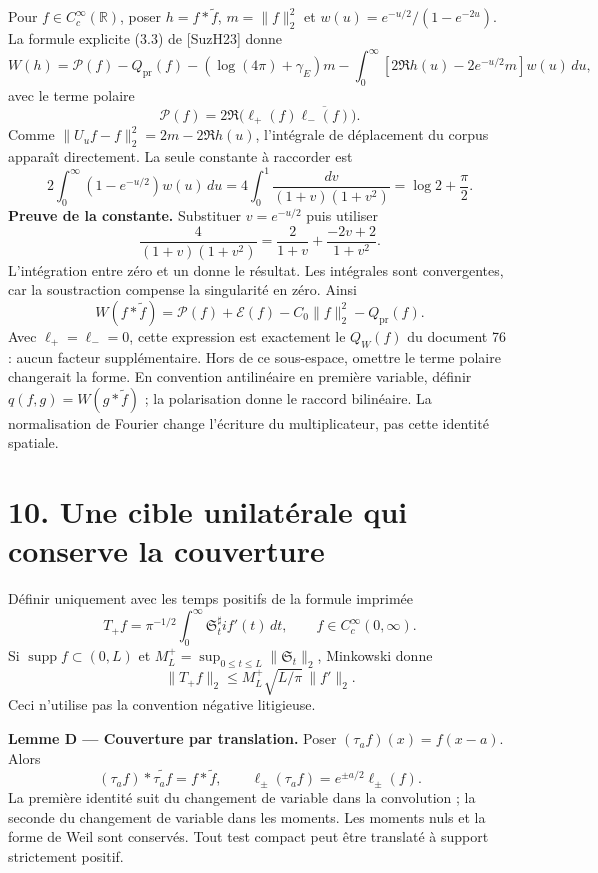 \documentclass[
  11pt,
]{article}
\begin{document}
Pour \(f\in C_c^\infty(\mathbb R)\), poser \(h=f*\widetilde f\),
\(m=\|f\|_2^2\) et \(w(u)=e^{-u/2}/(1-e^{-2u})\). La formule explicite
(3.3) de {[}SuzH23{]} donne \[
W(h)=\mathcal P(f)-Q_{\mathrm{pr}}(f)
 -(\log(4\pi)+\gamma_E)m
 -\int_0^\infty[2\Re h(u)-2e^{-u/2}m]w(u)\,du,
\] avec le terme polaire \[
\mathcal P(f)=2\Re\bigl(\ell_+(f)\overline{\ell_-(f)}\bigr).
\] Comme \(\|U_uf-f\|_2^2=2m-2\Re h(u)\), l'intégrale de déplacement du
corpus apparaît directement. La seule constante à raccorder est \[
2\int_0^\infty(1-e^{-u/2})w(u)\,du
=4\int_0^1\frac{dv}{(1+v)(1+v^2)}
=\log 2+\frac\pi2.
\] \textbf{Preuve de la constante.} Substituer \(v=e^{-u/2}\) puis
utiliser \[
\frac4{(1+v)(1+v^2)}
=\frac2{1+v}+\frac{-2v+2}{1+v^2}.
\] L'intégration entre zéro et un donne le résultat. Les intégrales sont
convergentes, car la soustraction compense la singularité en zéro. Ainsi
\[
\boxed{W(f*\widetilde f)=\mathcal P(f)
 +\mathcal E(f)-C_0\|f\|_2^2-Q_{\mathrm{pr}}(f).}
\] Avec \(\ell_+=\ell_-=0\), cette expression est exactement le
\(Q_W(f)\) du document 76 : aucun facteur supplémentaire. Hors de ce
sous-espace, omettre le terme polaire changerait la forme. En convention
antilinéaire en première variable, définir \(q(f,g)=W(g*\widetilde f)\)
; la polarisation donne le raccord bilinéaire. La normalisation de
Fourier change l'écriture du multiplicateur, pas cette identité
spatiale.

\hypertarget{une-cible-unilatuxe9rale-qui-conserve-la-couverture}{%
\section{10. Une cible unilatérale qui conserve la
couverture}\label{une-cible-unilatuxe9rale-qui-conserve-la-couverture}}

Définir uniquement avec les temps positifs de la formule imprimée \[
T_+f=\pi^{-1/2}\int_0^\infty\mathfrak S_t^\sharp if'(t)\,dt,
\qquad f\in C_c^\infty(0,\infty).
\] Si \(\operatorname{supp}f\subset(0,L)\) et
\(M_L^+=\sup_{0\le t\le L}\|\mathfrak S_t\|_2\), Minkowski donne \[
\|T_+f\|_2\le M_L^+\sqrt{L/\pi}\,\|f'\|_2.
\] Ceci n'utilise pas la convention négative litigieuse.

\textbf{Lemme D --- Couverture par translation.} Poser
\((\tau_af)(x)=f(x-a)\). Alors \[
(\tau_af)*\widetilde{\tau_af}=f*\widetilde f,
\qquad\ell_\pm(\tau_af)=e^{\pm a/2}\ell_\pm(f).
\] La première identité suit du changement de variable dans la
convolution ; la seconde du changement de variable dans les moments. Les
moments nuls et la forme de Weil sont conservés. Tout test compact peut
être translaté à support strictement positif.
\end{document}
